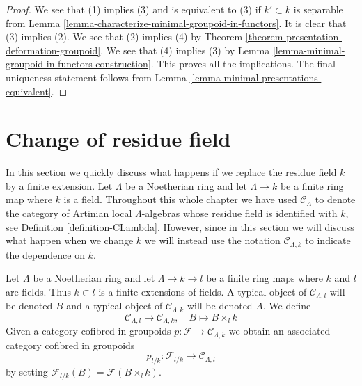 \begin{proof}
We see that (1) implies (3) and is equivalent to (3) if
$k' \subset k$ is separable from
Lemma \ref{lemma-characterize-minimal-groupoid-in-functors}.
It is clear that (3) implies (2). We see that (2) implies (4) by
Theorem \ref{theorem-presentation-deformation-groupoid}.
We see that (4) implies (3) by
Lemma \ref{lemma-minimal-groupoid-in-functors-construction}.
This proves all the implications.
The final uniqueness statement follows from
Lemma \ref{lemma-minimal-presentations-equivalent}.
\end{proof}













\section{Change of residue field}
\label{section-change-of-field}

\noindent
In this section we quickly discuss what happens if we replace the residue
field $k$ by a finite extension. Let $\Lambda$ be a Noetherian ring and
let $\Lambda \to k$ be a finite ring map where $k$ is a field. Throughout
this whole chapter we have used $\mathcal{C}_\Lambda$ to denote the
category of Artinian local $\Lambda$-algebras whose residue field is
identified with $k$, see Definition \ref{definition-CLambda}.
However, since in this section we will discuss what happen when we change
$k$ we will instead use the notation $\mathcal{C}_{\Lambda, k}$ to
indicate the dependence on $k$.

\begin{situation}
\label{situation-change-of-fields}
Let $\Lambda$ be a Noetherian ring and let $\Lambda \to k \to l$ be a finite
ring maps where $k$ and $l$ are fields. Thus $k \subset l$ is a finite
extensions of fields. A typical object of $\mathcal{C}_{\Lambda, l}$ will be
denoted $B$ and a typical object of $\mathcal{C}_{\Lambda, k}$ will be
denoted $A$. We define
\begin{equation}
\label{equation-comparison}
\mathcal{C}_{\Lambda, l} \longrightarrow \mathcal{C}_{\Lambda, k},
\quad
B \longmapsto B \times_l k
\end{equation}
Given a category cofibred in groupoids
$p : \mathcal{F} \to \mathcal{C}_{\Lambda, k}$ we obtain
an associated category cofibred in groupoids
$$
p_{l/k} : \mathcal{F}_{l/k} \longrightarrow \mathcal{C}_{\Lambda, l}
$$
by setting $\mathcal{F}_{l/k}(B) = \mathcal{F}(B \times_l k)$.
\end{situation}

